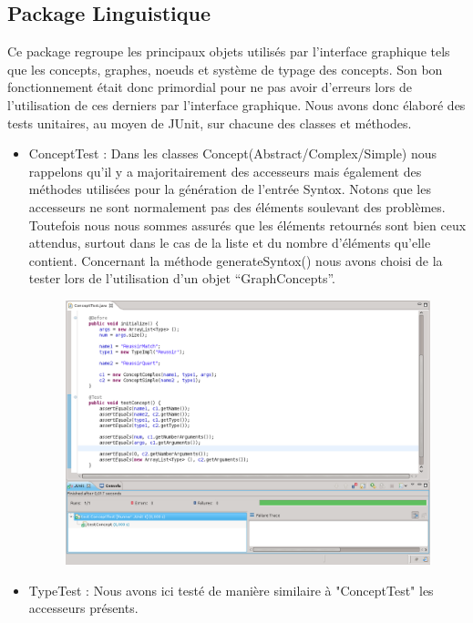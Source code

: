 \documentclass[12pt]{report}
\begin{document}
\subsection{Package Linguistique}
Ce package regroupe les principaux objets utilisés par l'interface graphique tels que les concepts, graphes, noeuds et système de typage des concepts. Son bon fonctionnement était donc primordial pour ne pas avoir d'erreurs lors de l'utilisation de ces derniers par l'interface graphique. Nous avons donc élaboré des tests unitaires, au moyen de JUnit, sur chacune des classes et méthodes. 
\begin{itemize}	
\item ConceptTest : Dans les classes Concept(Abstract/Complex/Simple) nous rappelons qu'il y a majoritairement des accesseurs mais également des méthodes utilisées pour la génération de l'entrée Syntox. Notons que les accesseurs ne sont normalement pas des éléments soulevant des problèmes. Toutefois nous nous sommes assurés que les éléments retournés sont bien ceux attendus, surtout dans le cas de la liste et du nombre d'éléments qu'elle contient.
Concernant la méthode generateSyntox() nous avons choisi de la tester lors de l'utilisation d'un objet ``GraphConcepts''.
\begin{figure}
\begin{center}
	\includegraphics[scale=0.40]{resultatTest1.png}
\end{center}
\end{figure}
\newpage
\item TypeTest : Nous avons ici testé de manière similaire à "ConceptTest" les accesseurs présents. 
\begin{figure}[h!]

\end{figure}
\end{itemize}
\end{document}
